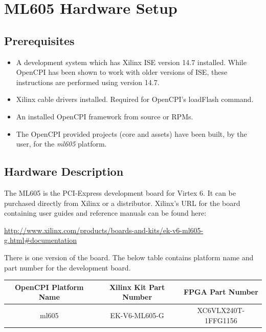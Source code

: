 \section{ML605 Hardware Setup}
\subsection{Prerequisites}
\begin{itemize}
	\item A development system which has Xilinx ISE version 14.7 installed. While OpenCPI has been shown to work with older versions of ISE, these instructions are performed using version 14.7.
	\item Xilinx cable drivers installed. Required for OpenCPI's loadFlash command.
	\item An installed OpenCPI framework from source or RPMs.
	\item The OpenCPI provided projects (core and assets) have been built, by the user, for the \textit{ml605} platform.
\end{itemize}

\subsection{Hardware Description}
The ML605 is the PCI-Express development board for Virtex 6. It can be purchased directly from Xilinx or a distributor. Xilinx's URL for the board containing user guides and reference manuals can be found here:\par\bigskip
​\url{http://www.xilinx.com/products/boards-and-kits/ek-v6-ml605-g.html#documentation}\par\bigskip
\noindent  There is one version of the board. The below table contains platform name and part number for the development board.\par\bigskip
\begin{tabular}{|c|c|c|}
	\hline
	\rowcolor{blue}OpenCPI Platform Name & Xilinx Kit Part Number & FPGA Part Number \\
	\hline
	ml605 & EK-V6-ML605-G & XC6VLX240T-1FFG1156 \\
	\hline
\end{tabular}\par\bigskip

